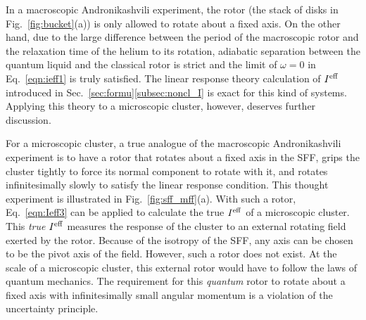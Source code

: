 \documentclass[12pt]{iopart}
\begin{document}
In a macroscopic Andronikashvili experiment, the rotor (the stack of disks in Fig.~\ref{fig:bucket}(a)) is only allowed to rotate about a fixed axis. On the other hand, due to the large difference between the period of the macroscopic rotor and the relaxation time of the helium to its rotation, adiabatic separation between the quantum liquid and the classical rotor is strict and the limit of $\omega=0$ in Eq.~\ref{eqn:ieff1} is truly satisfied. 
The linear response theory calculation of $I^{\rm eff}$ introduced in Sec.~\ref{sec:formu}\ref{subsec:noncl_I} is exact for this kind of systems. 
Applying this theory to a microscopic cluster, however, deserves further discussion.

For a microscopic cluster, a true analogue of the macroscopic Andronikashvili experiment is to have a rotor that rotates about a fixed axis in the SFF, grips the cluster tightly to force its normal component to rotate with it, and rotates infinitesimally slowly to satisfy the linear response condition. 
This thought experiment is illustrated in Fig.~\ref{fig:sff_mff}(a). 
With such a rotor, Eq.~\ref{eqn:Ieff3} can be applied to calculate the true $I^{\rm eff}$ of a microscopic cluster. 
This {\em true} $I^{\rm eff}$ measures the response of the cluster to an external rotating field exerted by the rotor. 
Because of the isotropy of the SFF, any axis can be chosen to be the pivot axis of the field. 
However, such a rotor does not exist. 
At the scale of a microscopic cluster, this external rotor would have to follow the laws of quantum mechanics. 
The requirement for this {\em quantum} rotor to rotate about a fixed axis with infinitesimally small angular momentum is a violation of the uncertainty principle.
\end{document}
